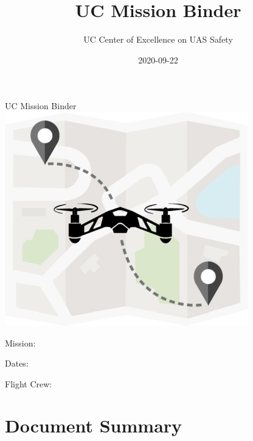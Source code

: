 \documentclass[
]{book}
\title{UC Mission Binder}
\author{UC Center of Excellence on UAS Safety}
\date{2020-09-22}
\let\oldmaketitle\maketitle
\begin{document}
\maketitle

\thispagestyle{empty}
\begin{center}
\vspace*{9em}
{\Huge UC Mission Binder}\\
\vspace*{9em}
\includegraphics{cover.jpg}\\
\vspace*{9em}
{\huge 

Mission: \hrulefill

Dates: \hrulefill

Flight Crew: \hrulefill

}
\vspace*{9em}
\end{center}

\let\maketitle\oldmaketitle
\maketitle

{
\setcounter{tocdepth}{1}
\tableofcontents
}
\hypertarget{document-summary}{%
\chapter*{Document Summary}\label{document-summary}}
\end{document}
